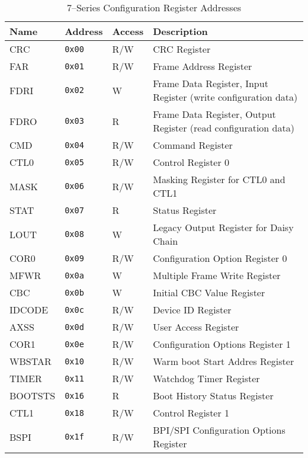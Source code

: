\documentclass{gqtekspec}
\begin{document}
\begin{table}[htbp]\begin{center}\hline
\begin{tabular}{|p{0.75in}|p{0.75in}|p{0.5in}|p{2.875in}|}\hline
\rowcolor[gray]{0.85} Name  & Address & Access & Description \\\hline\hline
CRC     & {\tt 0x00} & R/W & CRC Register \\\hline
FAR     & {\tt 0x01} & R/W & Frame Address Register\\\hline
FDRI    & {\tt 0x02} &   W & Frame Data Register, Input Register (write configuration data)\\\hline
FDRO    & {\tt 0x03} & R   & Frame Data Register, Output Register (read configuration data)\\\hline
CMD     & {\tt 0x04} & R/W & Command Register\\\hline
CTL0    & {\tt 0x05} & R/W & Control Register 0\\\hline
MASK    & {\tt 0x06} & R/W & Masking Register for CTL0 and CTL1\\\hline
STAT    & {\tt 0x07} & R   & Status Register\\\hline
LOUT    & {\tt 0x08} &   W & Legacy Output Register for Daisy Chain\\\hline
COR0    & {\tt 0x09} & R/W & Configuration Option Register 0\\\hline
MFWR    & {\tt 0x0a} &   W & Multiple Frame Write Register \\\hline
CBC     & {\tt 0x0b} &   W & Initial CBC Value Register \\\hline
IDCODE  & {\tt 0x0c} & R/W & Device ID Register\\\hline
AXSS    & {\tt 0x0d} & R/W & User Access Register \\\hline
COR1    & {\tt 0x0e} & R/W & Configuration Options Register 1\\\hline
WBSTAR  & {\tt 0x10} & R/W & Warm boot Start Addres Register \\\hline
TIMER   & {\tt 0x11} & R/W & Watchdog Timer Register\\\hline
BOOTSTS & {\tt 0x16} & R   & Boot History Status Register \\\hline
CTL1    & {\tt 0x18} & R/W & Control Register 1 \\\hline
BSPI    & {\tt 0x1f} & R/W & BPI/SPI Configuration Options Register\\\hline
\end{tabular}
\caption{7--Series Configuration Register Addresses}\label{tbl:7addrs}
\end{center}\end{table}
\end{document}
